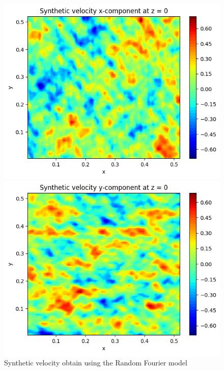 \documentclass[a4paper,12pt]{article}
\theoremstyle{definition}
\begin{document}
\begin{figure}[H]
    \centering
    \begin{minipage}{0.49\textwidth}
        \centering
        \includegraphics[width=\linewidth]{illustrations/Velocity_Example.png}
    \end{minipage}
    \hfill
    \begin{minipage}{0.49\textwidth}
        \centering
        \includegraphics[width=\linewidth]{illustrations/Velocity_Example2.png}
    \end{minipage}
    \caption{Synthetic velocity obtain using the Random Fourier model}
\end{figure}
\end{document}
